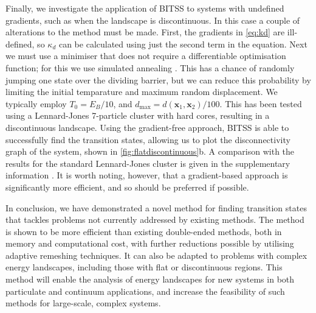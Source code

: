 \documentclass[aps,prl,twocolumn,10pt,groupedaddress]{revtex4-2}
\begin{document}
Finally, we investigate the application of BITSS to systems with undefined gradients, such as when the landscape is discontinuous.
In this case a couple of alterations to the method must be made.
First, the gradients in \cref{eq:kd} are ill-defined, so $\kappa_d$ can be calculated using just the second term in the equation.
Next we must use a minimiser that does not require a differentiable optimisation function; for this we use simulated annealing \cite{Kirkpatrick1983}.
This has a chance of randomly jumping one state over the dividing barrier, but we can reduce this probability by limiting the initial temparature and maximum random displacement. We typically employ $T_0 = E_B / 10$, and $d_\text{max} = d(\bm{x}_1, \bm{x}_2) / 100$.
This has been tested using a Lennard-Jones 7-particle cluster with hard cores, resulting in a discontinuous landscape.
Using the gradient-free approach, BITSS is able to successfully find the transition states, allowing us to plot the disconnectivity graph of the system, shown in \cref{fig:flatdiscontinuous}b.
A comparison with the results for the standard Lennard-Jones cluster is given in the supplementary information \cite{Note1}.
It is worth noting, however, that a gradient-based approach is significantly more efficient, and so should be preferred if possible.


In conclusion, we have demonstrated a novel method for finding transition states that tackles problems not currently addressed by existing methods.
The method is shown to be more efficient than existing double-ended methods, both in memory and computational cost, with further reductions possible by utilising adaptive remeshing techniques.
It can also be adapted to problems with complex energy landscapes, including those with flat or discontinuous regions.
This method will enable the analysis of energy landscapes for new systems in both particulate and continuum applications, and increase the feasibility of such methods for large-scale, complex systems.


\appendix
\section{}
\end{document}
